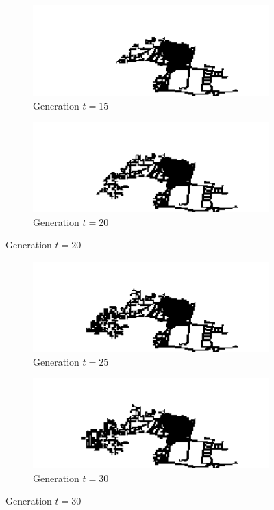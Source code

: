 \begin{figure}[H]
\begin{subfigure}{.5\textwidth}
  \centering
  \includegraphics[width=1\linewidth]{Figures/Chapter4/generation-15-melusi}
  \caption*{Generation $t = 15$}
\end{subfigure}
\begin{subfigure}{.5\textwidth}
  \centering
  \includegraphics[width=1\linewidth]{Figures/Chapter4/generation-20-melusi}
  \caption*{Generation $t = 20$}
\end{subfigure}
\end{figure}

\begin{figure}[H]
\begin{subfigure}{.5\textwidth}
  \centering
  \includegraphics[width=1\linewidth]{Figures/Chapter4/generation-25-melusi}
  \caption*{Generation $t = 25$}
\end{subfigure}
\begin{subfigure}{.5\textwidth}
  \centering
  \includegraphics[width=1\linewidth]{Figures/Chapter4/generation-30-melusi}
  \caption*{Generation $t = 30$}
\end{subfigure}
\end{figure}

